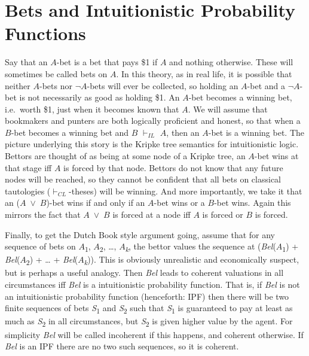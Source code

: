 \documentclass[
  11pt,
  letterpaper,
  DIV=11,
  numbers=noendperiod,
  oneside]{scrartcl}
\begin{document}
\section{Bets and Intuitionistic Probability
Functions}\label{bets-and-intuitionistic-probability-functions}

Say that an \(A\)-bet is a bet that pays \$1 if \(A\) and nothing
otherwise. These will sometimes be called bets on \(A\). In this theory,
as in real life, it is possible that neither \(A\)-bets nor
\({\lnot}\)\(A\)-bets will ever be collected, so holding an \(A\)-bet
and a \({\lnot}\)\(A\)-bet is not necessarily as good as holding \$1. An
\(A\)-bet becomes a winning bet, i.e.~worth \$1, just when it becomes
known that \(A\). We will assume that bookmakers and punters are both
logically proficient and honest, so that when a \(B\)-bet becomes a
winning bet and \(B\) \(\vdash_{IL}\) \(A\), then an \(A\)-bet is a
winning bet. The picture underlying this story is the Kripke tree
semantics for intuitionistic logic. Bettors are thought of as being at
some node of a Kripke tree, an \(A\)-bet wins at that stage iff \(A\) is
forced by that node. Bettors do not know that any future nodes will be
reached, so they cannot be confident that all bets on classical
tautologies (\(\vdash_{CL}\)-theses) will be winning. And more
importantly, we take it that an (\(A\)~\({\vee}\)~\(B\))-bet wins if and
only if an \(A\)-bet wins or a \(B\)-bet wins. Again this mirrors the
fact that \(A\)~\({\vee}\)~\(B\) is forced at a node iff \(A\) is forced
or \(B\) is forced.

Finally, to get the Dutch Book style argument going, assume that for any
sequence of bets on \(A\)\textsubscript{1}, \(A\)\textsubscript{2},
\ldots, \(A\)\textsubscript{\emph{k}}, the bettor values the sequence at
(\emph{Bel}(\(A\)\textsubscript{1}) + \emph{Bel}(\(A\)\textsubscript{2})
+ \ldots{} + \emph{Bel}(\(A\)\textsubscript{\emph{k}})). This is
obviously unrealistic and economically suspect,
but is perhaps a useful analogy. Then \emph{Bel} leads to coherent
valuations in all circumstances iff \emph{Bel} is a intuitionistic
probability function. That is, if \emph{Bel} is not an intuitionistic
probability function (henceforth: IPF) then there will be two finite
sequences of bets \emph{S}\textsubscript{1} and
\emph{S}\textsubscript{2} such that \emph{S}\textsubscript{1} is
guaranteed to pay at least as much as \emph{S}\textsubscript{2} in all
circumstances, but \emph{S}\textsubscript{2} is given higher value by
the agent. For simplicity \emph{Bel} will be called incoherent if this
happens, and coherent otherwise. If \emph{Bel} is an IPF there are no
two such sequences, so it is coherent.
\end{document}
